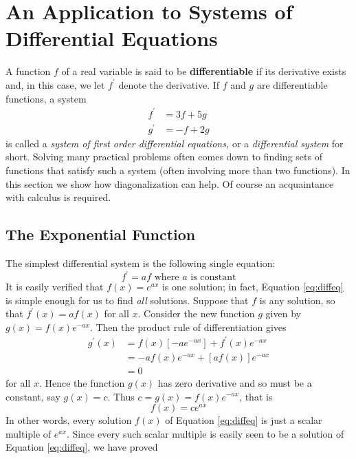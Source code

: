 
\section{An Application to Systems of Differential Equations}
\label{sec:3_7}

A function $f$ of a real variable is said to be \textbf{differentiable} if its derivative exists and, in this case, we let $f^{\prime}$ denote the derivative. If $f$ and $g$ are differentiable functions, a system
\begin{align*}
f^{\prime} &= 3f + 5g \\
g^{\prime} &= -f + 2g 
\end{align*}
is called a \textit{system of first order differential equations,} or a \textit{differential system} for short. Solving many practical problems often comes down to finding 
sets of functions that satisfy such a system (often involving more than 
two functions). In this section we show how diagonalization can help. Of
 course an acquaintance with calculus is required.


\subsection*{The Exponential Function}

The simplest differential system is the following single equation:
\begin{equation}\label{eq:diffeq}
f^{\prime} = af \mbox{ where } a \mbox{ is constant}
\end{equation}
It is easily verified that $f(x) = e ^{ax}$ is one solution; in fact, Equation \ref{eq:diffeq} is simple enough for us to find \textit{all} solutions. Suppose that $f$ is any solution, so that $f^{\prime}(x) = af(x)$ for all $x$. Consider the new function $g$ given by $g(x) = f(x)e^{-ax}$. Then the product rule of differentiation gives
\begin{align*}
g^{\prime}(x) & = f(x) \left[ -ae^{-ax} \right] + f^{\prime}(x) e^{-ax} \\
&= -af(x)e^{-ax} + \left[ af(x)\right] e^{-ax} \\
&= 0
\end{align*}
for all $x$. Hence the function $g(x)$ has zero derivative and so must be a constant, say $g(x) = c$. Thus $c = g(x) = f(x)e^{-ax}$, that is
\begin{equation*}
f(x) = ce^{ax}
\end{equation*}
In other words, every solution $f(x)$ of Equation \ref{eq:diffeq} is just a scalar multiple of $e^{ax}$. Since every such scalar multiple is easily seen to be a solution of Equation \ref{eq:diffeq}, we have proved


